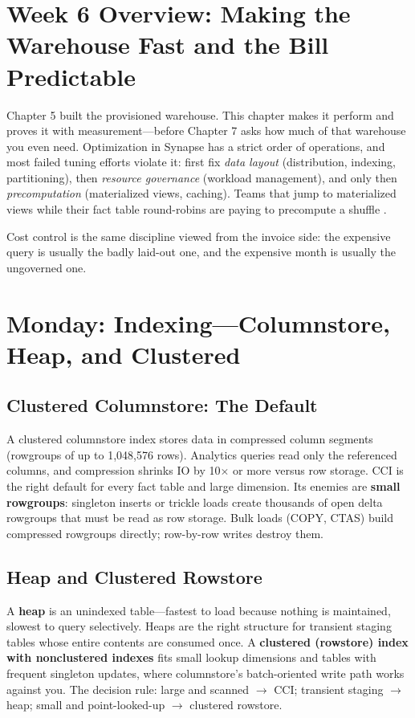 \section{Week 6 Overview: Making the Warehouse Fast and the Bill Predictable}
Chapter 5 built the provisioned warehouse. This chapter makes it perform and proves it with measurement---before Chapter 7 asks how much of that warehouse you even need. Optimization in Synapse has a strict order of operations, and most failed tuning efforts violate it: first fix \emph{data layout} (distribution, indexing, partitioning), then \emph{resource governance} (workload management), and only then \emph{precomputation} (materialized views, caching). Teams that jump to materialized views while their fact table round-robins are paying to precompute a shuffle \cite{microsoft2025synapseDedicatedBest}.

Cost control is the same discipline viewed from the invoice side: the expensive query is usually the badly laid-out one, and the expensive month is usually the ungoverned one.

\section{Monday: Indexing---Columnstore, Heap, and Clustered}

\subsection{Clustered Columnstore: The Default}
A clustered columnstore index stores data in compressed column segments (rowgroups of up to 1{,}048{,}576 rows). Analytics queries read only the referenced columns, and compression shrinks IO by 10$\times$ or more versus row storage. CCI is the right default for every fact table and large dimension. Its enemies are \textbf{small rowgroups}: singleton inserts or trickle loads create thousands of open delta rowgroups that must be read as row storage. Bulk loads (COPY, CTAS) build compressed rowgroups directly; row-by-row writes destroy them.

\subsection{Heap and Clustered Rowstore}
A \textbf{heap} is an unindexed table---fastest to load because nothing is maintained, slowest to query selectively. Heaps are the right structure for transient staging tables whose entire contents are consumed once. A \textbf{clustered (rowstore) index with nonclustered indexes} fits small lookup dimensions and tables with frequent singleton updates, where columnstore's batch-oriented write path works against you. The decision rule: large and scanned $\rightarrow$ CCI; transient staging $\rightarrow$ heap; small and point-looked-up $\rightarrow$ clustered rowstore.

